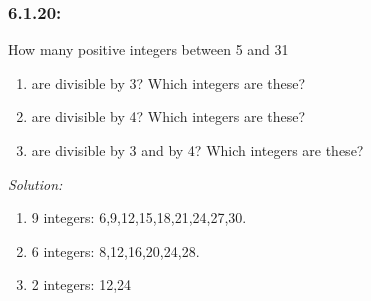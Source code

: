 \documentclass[a4paper]{article}
\begin{document}
\subsubsection*{6.1.20:}How many positive integers between 5 and 31
\begin{enumerate}[label = \textbf{\alph*)}]
	\item are divisible by 3? Which integers are these?
	\item are divisible by 4? Which integers are these?
	\item are divisible by 3 and by 4? Which integers are these?
\end{enumerate}
\textit{Solution:} \\ 
\begin{enumerate}[label = \textbf{\alph*)}]
	\item 9 integers: 6,9,12,15,18,21,24,27,30.
	\item 6 integers: 8,12,16,20,24,28.
	\item 2 integers: 12,24
\end{enumerate}
\end{document}
